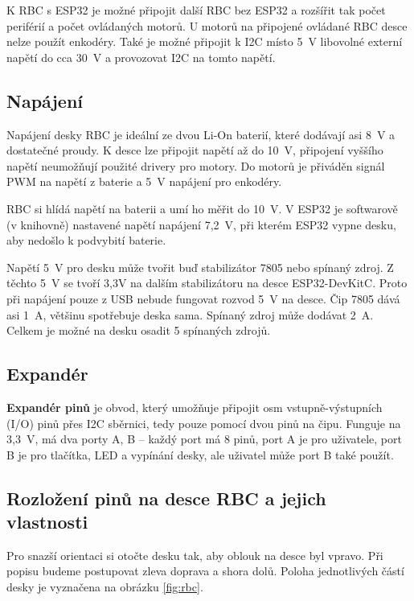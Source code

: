 K RBC s ESP32 je možné připojit další RBC bez ESP32 a rozšířit tak počet periférií a počet ovládaných motorů. 
U motorů na připojené ovládané RBC desce nelze použít enkodéry. 
Také je možné připojit k I2C místo 5~V libovolné externí napětí do cca 30~V  a provozovat I2C na tomto napětí. 

\subsection{Napájení}

Napájení desky RBC je ideální ze dvou Li-On baterií, %
 které dodávají asi 8~V a dostatečné proudy. 
 K desce lze připojit napětí až do 10~V, připojení vyššího napětí neumožňují použité drivery pro motory. %
 Do motorů je přiváděn signál PWM na napětí z baterie a 5~V napájení pro enkodéry.  

RBC si hlídá napětí na baterii a umí ho měřit do 10~V. 
V ESP32 je softwarově (v knihovně) nastavené napětí napájení 7,2~V, při kterém ESP32 vypne desku, aby nedošlo k podvybití baterie.  

Napětí 5~V pro desku může tvořit buď stabilizátor 7805 nebo spínaný zdroj.  
Z těchto 5~V se tvoří 3,3V na dalším stabilizátoru na desce ESP32-DevKitC. 
Proto při napájení pouze z USB nebude fungovat rozvod 5~V na desce. 
Čip 7805 dává asi 1~A, většinu spotřebuje deska sama. 
Spínaný zdroj může dodávat 2~A. Celkem je možné na desku osadit 5 spínaných zdrojů.   


\subsection{Expandér}

\textbf{Expandér pinů} \label{expander}   je obvod, který umožňuje připojit osm vstupně-výstupních (I/O) pinů přes I2C sběrnici, tedy pouze pomocí dvou pinů na čipu. 
Funguje na 3,3~V, má dva porty A, B -- každý port má 8 pinů, port A je pro uživatele, port B je pro tlačítka, LED a vypínání desky, ale uživatel může port B také použít.


\subsection{Rozložení pinů na desce RBC a jejich vlastnosti}

Pro snazší orientaci si otočte desku tak, aby oblouk na desce byl vpravo. 
Při popisu budeme postupovat zleva doprava a shora dolů. 
Poloha jednotlivých částí desky je vyznačena na obrázku \ref{fig:rbc}. 

